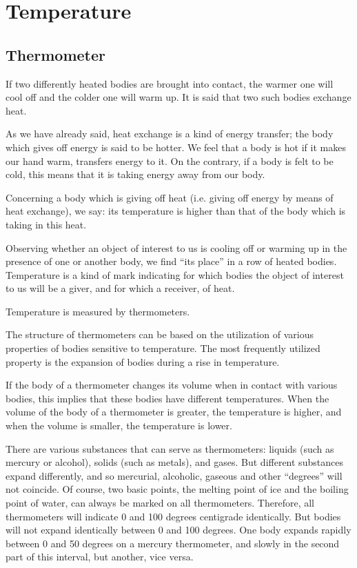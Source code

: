

\cleardoublepage
\chapter{Temperature}
\label{ch-03}

\section{Thermometer}
If two differently heated bodies are brought into contact, the warmer one will cool off and the colder one will warm up. It is said that two such bodies exchange heat.

As we have already said, heat exchange is a kind of energy transfer; the body which gives off energy is said to be hotter. We feel that a body is hot if it makes our hand warm, transfers energy to it. On the contrary, if a body is felt to be cold, this means that it is taking energy away from our body.

Concerning a body which is giving off heat (i.e. giving off energy by means of heat exchange), we say: its temper­ature is higher than that of the body which is taking in this heat.

Observing whether an object of interest to us is cooling off or warming up in the presence of one or another body, we find ``its place'' in a row of heated bodies. Temperature is a kind of mark indicating for which bodies the object of interest to us will be a giver, and for which a receiver, of heat.

Temperature is measured by thermometers.

The structure of thermometers can be based on the utilization of various properties of bodies sensitive to temperature. The most frequently utilized property is the expansion of bodies during a rise in temperature.

If the body of a thermometer changes its volume when in contact with various bodies, this implies that these bodies have different temperatures. When the volume of the body of a thermometer is greater, the temperature is higher, and when the volume is smaller, the temperature is lower.

There are various substances that can serve as thermom­eters: liquids (such as mercury or alcohol), solids (such as metals), and gases. But different substances expand differently, and so mercurial, alcoholic, gaseous and other ``degrees'' will not coincide. Of course, two basic points, the melting point of ice and the boiling point of water, can always be marked on all thermometers. Therefore, all thermometers will indicate 0 and 100 degrees centi­grade identically. But bodies will not expand identically between 0 and 100 degrees. One body expands rapidly between 0 and 50 degrees on a mercury thermometer, and slowly in the second part of this interval, but another, vice versa.


